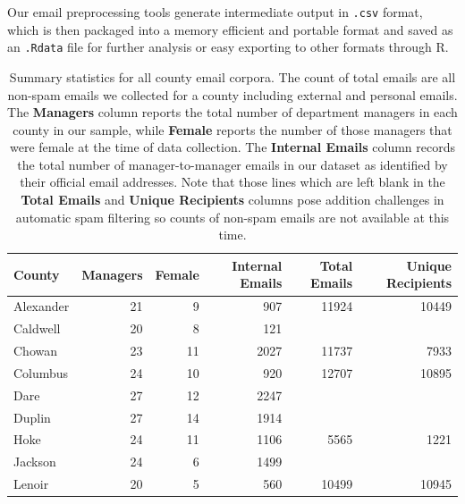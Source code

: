 \documentclass[fleqn]{MJDArticle}
\begin{document}

Our email preprocessing tools generate intermediate output in \texttt{.csv} format, which is then packaged into a memory efficient and portable format and saved as an \texttt{.Rdata} file for further analysis or easy exporting to other formats through R. 

%
%
\begin{table}[ht]
\caption{\label{tab:county email summaries} Summary statistics for all county email corpora. The count of total emails are all non-spam emails we collected for a county including external and personal emails. The \textbf{Managers} column reports the total number of department managers in each county in our sample, while \textbf{Female} reports the number of those managers that were female at the time of data collection. The \textbf{Internal Emails} column records the total number of manager-to-manager emails in our dataset as identified by their official email addresses. Note that those lines which are left blank in the \textbf{Total Emails} and \textbf{Unique Recipients} columns pose addition challenges in automatic spam filtering so counts of non-spam emails are not available at this time.  }
\centering
\begin{tabular}{lrrrrr}
  \hline
 \textbf{County} & \textbf{Managers} & \textbf{Female} & \textbf{Internal Emails} &\textbf{Total Emails} & \textbf{Unique Recipients} \\
  \hline
  \rowcolor{Grey}
Alexander & 21 & 9 & 907 & 11924 & 10449 \\
Caldwell & 20 & 8 & 121 &  &  \\
\rowcolor{Grey}
Chowan & 23 & 11 & 2027 & 11737 & 7933 \\
Columbus & 24 & 10 & 920 & 12707 & 10895 \\
\rowcolor{Grey}
Dare & 27 & 12 & 2247 &  &  \\
Duplin & 27 & 14 & 1914 &  &  \\
\rowcolor{Grey}
Hoke & 24 & 11 & 1106 & 5565 & 1221 \\
Jackson & 24 & 6 & 1499 &  &  \\
\rowcolor{Grey}
Lenoir & 20 & 5 & 560 & 10499 & 10945 \\

\end{tabular}
\end{table}
\end{document}
